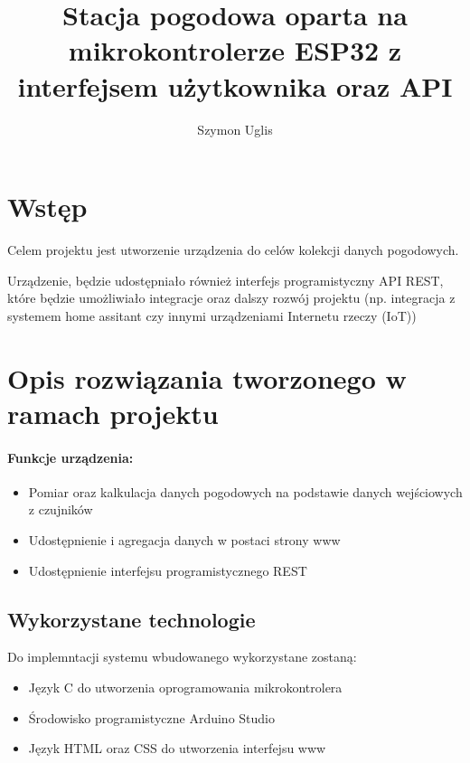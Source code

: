 \documentclass[12pt,a4paper]{article}
\title{Stacja pogodowa oparta na mikrokontrolerze ESP32 z interfejsem użytkownika oraz API}
\author{Szymon Uglis}
\begin{document}
\begin{titlepage}
    \maketitle
\end{titlepage}

\tableofcontents{}
\pagebreak

\section{Wstęp}

Celem projektu jest utworzenie urządzenia do celów kolekcji danych pogodowych. 

Urządzenie, będzie udostępniało również interfejs programistyczny API REST, które będzie umożliwiało integracje oraz dalszy rozwój projektu 
(np. integracja z systemem home assitant czy innymi urządzeniami Internetu rzeczy (IoT))

\section{Opis rozwiązania tworzonego w ramach projektu}

\paragraph{Funkcje urządzenia:}
\begin{itemize}
    \item Pomiar oraz kalkulacja danych pogodowych na podstawie danych wejściowych z czujników
    \item Udostępnienie i agregacja danych w postaci strony www
    \item Udostępnienie interfejsu programistycznego REST 
\end{itemize}

\subsection{Wykorzystane technologie}
Do implemntacji systemu wbudowanego wykorzystane zostaną:
\begin{itemize}
    \item Język C do utworzenia oprogramowania mikrokontrolera
    \item Środowisko programistyczne Arduino Studio
    \item Język HTML oraz CSS do utworzenia interfejsu www
\end{itemize}
\end{document}
